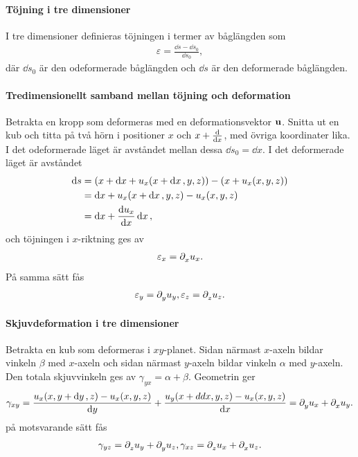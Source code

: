 \paragraph{Töjning i tre dimensioner}
I tre dimensioner definieras töjningen i termer av båglängden som
\begin{align*}
	\varepsilon = \frac{\dd{s} - \dd{s_{0}}}{\dd{s_{0}}},
\end{align*}
där $\dd{s_{0}}$ är den odeformerade båglängden och $\dd{s}$ är den deformerade båglängden.

\paragraph{Tredimensionellt samband mellan töjning och deformation}
Betrakta en kropp som deformeras med en deformationsvektor $\vb{u}$. Snitta ut en kub och titta på två hörn i positioner $x$ och $x + \dv{x}$, med övriga koordinater lika. I det odeformerade läget är avståndet mellan dessa $\dd{s_{0}} = \dd{x}$. I det deformerade läget är avståndet
\begin{align*}
	\dd{s} &= (x + \dd{x} + u_{x}(x + \dd{x}, y, z)) - (x + u_{x}(x, y, z)) \\
	       &= \dd{x} + u_{x}(x + \dd{x}, y, z) - u_{x}(x, y, z) \\
	       &= \dd{x} + \dv{u_{x}}{x}\dd{x},
\end{align*}
och töjningen i $x$-riktning ges av
\begin{align*}
	\varepsilon_{x} = \partial_{x}^{}u_{x}.
\end{align*}
På samma sätt fås
\begin{align*}
	\varepsilon_{y} = \partial_{y}^{}u_{y}, \varepsilon_{z} = \partial_{z}^{}u_{z}.
\end{align*}

\paragraph{Skjuvdeformation i tre dimensioner}
Betrakta en kub som deformeras i $xy$-planet. Sidan närmast $x$-axeln bildar vinkeln $\beta$ med $x$-axeln och sidan närmast $y$-axeln bildar vinkeln $\alpha$ med $y$-axeln. Den totala skjuvvinkeln ges av $\gamma_{yx} = \alpha + \beta$. Geometrin ger
\begin{align*}
	\gamma_{xy} = \frac{u_{x}(x, y + \dd{y}, z) - u_{x}(x, y, z)}{\dd{y}} + \frac{u_{y}(x + dd{x}, y, z) - u_{x}(x, y, z)}{\dd{x}} = \partial_{y}^{}u_{x} + \partial_{x}^{}u_{y}.
\end{align*}
på motsvarande sätt fås
\begin{align*}
	\gamma_{yz} = \partial_{z}^{}u_{y} + \partial_{y}^{}u_{z}, \gamma_{xz} = \partial_{z}^{}u_{x} + \partial_{x}^{}u_{z}.
\end{align*}

